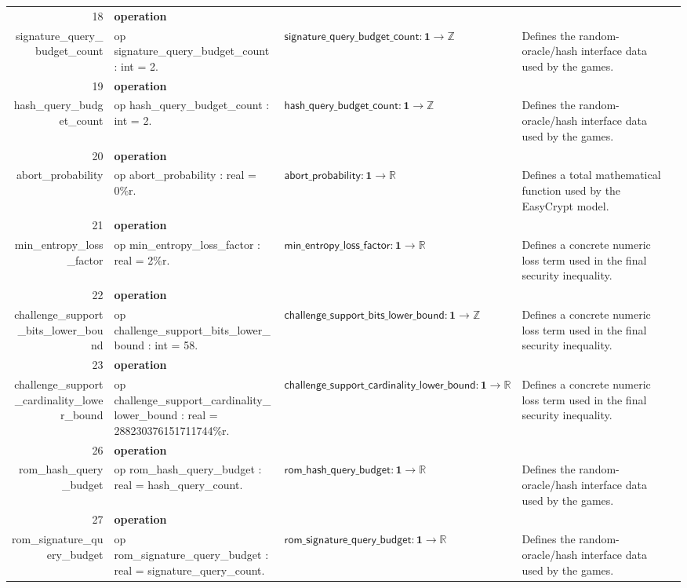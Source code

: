 \documentclass[10pt]{article}
\newcommand{\ec}[1]{\begingroup\ttfamily\scriptsize #1\endgroup}
\begin{document}
\begin{longtable}{r L{0.17\textwidth} L{0.26\textwidth} L{0.27\textwidth} L{0.20\textwidth}}
18 & \textbf{operation}\\\ec{signature\_query\_budget\_count} & \ec{op signature\_query\_budget\_count : int = 2.} & \(\mathsf{signature\_query\_budget\_count} : \mathbf{1} \to \mathbb{Z}\) & Defines the random-oracle/hash interface data used by the games. \\
19 & \textbf{operation}\\\ec{hash\_query\_budget\_count} & \ec{op hash\_query\_budget\_count : int = 2.} & \(\mathsf{hash\_query\_budget\_count} : \mathbf{1} \to \mathbb{Z}\) & Defines the random-oracle/hash interface data used by the games. \\
20 & \textbf{operation}\\\ec{abort\_probability} & \ec{op abort\_probability : real = 0\%r.} & \(\mathsf{abort\_probability} : \mathbf{1} \to \mathbb{R}\) & Defines a total mathematical function used by the EasyCrypt model. \\
21 & \textbf{operation}\\\ec{min\_entropy\_loss\_factor} & \ec{op min\_entropy\_loss\_factor : real = 2\%r.} & \(\mathsf{min\_entropy\_loss\_factor} : \mathbf{1} \to \mathbb{R}\) & Defines a concrete numeric loss term used in the final security inequality. \\
22 & \textbf{operation}\\\ec{challenge\_support\_bits\_lower\_bound} & \ec{op challenge\_support\_bits\_lower\_bound : int = 58.} & \(\mathsf{challenge\_support\_bits\_lower\_bound} : \mathbf{1} \to \mathbb{Z}\) & Defines a concrete numeric loss term used in the final security inequality. \\
23 & \textbf{operation}\\\ec{challenge\_support\_cardinality\_lower\_bound} & \ec{op challenge\_support\_cardinality\_lower\_bound : real = 288230376151711744\%r.} & \(\mathsf{challenge\_support\_cardinality\_lower\_bound} : \mathbf{1} \to \mathbb{R}\) & Defines a concrete numeric loss term used in the final security inequality. \\
26 & \textbf{operation}\\\ec{rom\_hash\_query\_budget} & \ec{op rom\_hash\_query\_budget : real = hash\_query\_count.} & \(\mathsf{rom\_hash\_query\_budget} : \mathbf{1} \to \mathbb{R}\) & Defines the random-oracle/hash interface data used by the games. \\
27 & \textbf{operation}\\\ec{rom\_signature\_query\_budget} & \ec{op rom\_signature\_query\_budget : real = signature\_query\_count.} & \(\mathsf{rom\_signature\_query\_budget} : \mathbf{1} \to \mathbb{R}\) & Defines the random-oracle/hash interface data used by the games. \\

\end{longtable}
\end{document}

